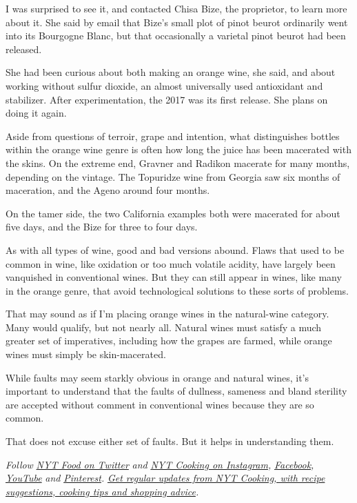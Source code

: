 I was surprised to see it, and contacted Chisa Bize, the proprietor, to
learn more about it. She said by email that Bize's small plot of pinot
beurot ordinarily went into its Bourgogne Blanc, but that occasionally a
varietal pinot beurot had been released.

She had been curious about both making an orange wine, she said, and
about working without sulfur dioxide, an almost universally used
antioxidant and stabilizer. After experimentation, the 2017 was its
first release. She plans on doing it again.

Aside from questions of terroir, grape and intention, what distinguishes
bottles within the orange wine genre is often how long the juice has
been macerated with the skins. On the extreme end, Gravner and Radikon
macerate for many months, depending on the vintage. The Topuridze wine
from Georgia saw six months of maceration, and the Ageno around four
months.

On the tamer side, the two California examples both were macerated for
about five days, and the Bize for three to four days.

As with all types of wine, good and bad versions abound. Flaws that used
to be common in wine, like oxidation or too much volatile acidity, have
largely been vanquished in conventional wines. But they can still appear
in wines, like many in the orange genre, that avoid technological
solutions to these sorts of problems.

That may sound as if I'm placing orange wines in the natural-wine
category. Many would qualify, but not nearly all. Natural wines must
satisfy a much greater set of imperatives, including how the grapes are
farmed, while orange wines must simply be skin-macerated.

While faults may seem starkly obvious in orange and natural wines, it's
important to understand that the faults of dullness, sameness and bland
sterility are accepted without comment in conventional wines because
they are so common.

That does not excuse either set of faults. But it helps in understanding
them.

\emph{Follow} \href{https://twitter.com/nytfood}{\emph{NYT Food on
Twitter}} \emph{and}
\href{https://www.instagram.com/nytcooking/}{\emph{NYT Cooking on
Instagram}}\emph{,}
\href{https://www.facebookcorewwwi.onion/nytcooking/}{\emph{Facebook}}\emph{,}
\href{https://www.youtube.com/nytcooking}{\emph{YouTube}} \emph{and}
\href{https://www.pinterest.com/nytcooking/}{\emph{Pinterest}}\emph{.}
\href{https://www.nytimes3xbfgragh.onion/newsletters/cooking}{\emph{Get
regular updates from NYT Cooking, with recipe suggestions, cooking tips
and shopping advice}}\emph{.}


